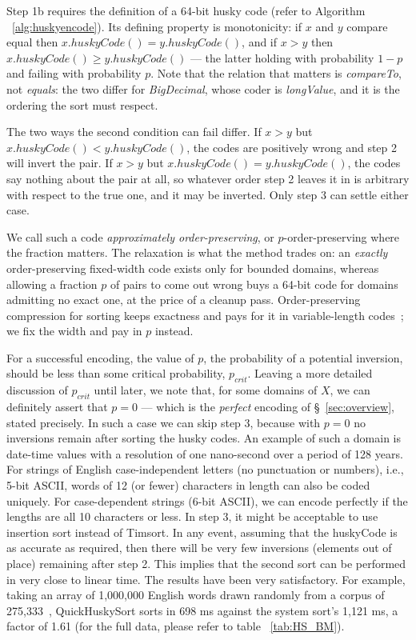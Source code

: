 \documentclass[twoside,leqno,twocolumn]{article}
\begin{document}
Step 1b requires the definition of a 64-bit husky code (refer to Algorithm ~\ref{alg:huskyencode}).
Its defining property is monotonicity: if $x$ and $y$ compare equal then
$x.huskyCode() = y.huskyCode()$, and if $x > y$ then $x.huskyCode() \geq y.huskyCode()$ --- the
latter holding with probability $1 - p$ and failing with probability $p$.
Note that the relation that matters is \textit{compareTo}, not \textit{equals}: the two differ for
\textit{BigDecimal}, whose coder is \textit{longValue}, and it is the ordering the sort must respect.

The two ways the second condition can fail differ.
If $x > y$ but $x.huskyCode() < y.huskyCode()$, the codes are positively wrong and step 2 will invert
the pair.
If $x > y$ but $x.huskyCode() = y.huskyCode()$, the codes say nothing about the pair at all, so
whatever order step 2 leaves it in is arbitrary with respect to the true one, and it may be inverted.
Only step 3 can settle either case.

We call such a code \textit{approximately order-preserving}, or \mbox{$p$-order-preserving} where the
fraction matters.
The relaxation is what the method trades on: an \emph{exactly} order-preserving fixed-width code
exists only for bounded domains, whereas allowing a fraction $p$ of pairs to come out wrong buys a
64-bit code for domains admitting no exact one, at the price of a cleanup pass.
Order-preserving compression for sorting keeps exactness and pays for it in variable-length
codes~\cite{doi:10.1109/ICDE.1996.492216,doi:10.1145/1064546.1180611}; we fix the width and pay in
$p$ instead.

For a successful encoding, the value of $p$, the probability of a potential inversion, should be less than some critical probability, $p_{crit}$.
Leaving a more detailed discussion of $p_{crit}$ until later, we note that, for some domains of $X$, we
can definitely assert that $p = 0$ --- which is the \textit{perfect} encoding of \S~\ref{sec:overview},
stated precisely.
In such a case we can skip step 3, because with $p = 0$ no inversions remain after sorting the husky
codes.
An example of such a domain is date-time values with a resolution of one nano-second over a period of 128 years.
For strings of English case-independent letters (no punctuation or numbers), i.e., 5-bit ASCII, words of 12 (or fewer) characters in length can also be coded uniquely.
For case-dependent strings (6-bit ASCII), we can encode perfectly if the lengths are all 10 characters or less.
In step 3, it might be acceptable to use insertion sort instead of Timsort.
In any event, assuming that the huskyCode is as accurate as required, then there will be very few inversions (elements out of place) remaining after step 2.
This implies that the second sort can be performed in very close to linear time.
The results have been very satisfactory.
For example, taking an array of 1,000,000 English words drawn randomly from a corpus of 275,333~\cite{GOLDHAHN12.327},
QuickHuskySort sorts in 698 ms against the system sort's 1,121 ms, a factor of 1.61
(for the full data, please refer to table ~\ref{tab:HS_BM}).
\end{document}
